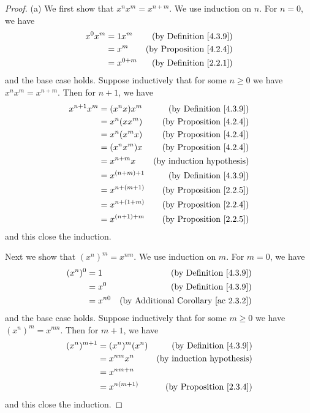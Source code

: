 \begin{proof}{(a)}
    We first show that \(x^n x^m = x^{n + m}\).
    We use induction on \(n\).
    For \(n = 0\), we have
    \begin{align*}
        x^0 x^m & = 1 x^m     & \text{(by Definition \ref{4.3.9})}  \\
                & = x^m       & \text{(by Proposition \ref{4.2.4})} \\
                & = x^{0 + m} & \text{(by Definition \ref{2.2.1})}
    \end{align*}
    and the base case holds.
    Suppose inductively that for some \(n \geq 0\) we have \(x^n x^m = x^{n + m}\).
    Then for \(n + 1\), we have
    \begin{align*}
        x^{n + 1} x^m & = (x^n x) x^m     & \text{(by Definition \ref{4.3.9})}  \\
                      & = x^n (x x^m)     & \text{(by Proposition \ref{4.2.4})} \\
                      & = x^n (x^m x)     & \text{(by Proposition \ref{4.2.4})} \\
                      & = (x^n x^m) x     & \text{(by Proposition \ref{4.2.4})} \\
                      & = x^{n + m} x     & \text{(by induction hypothesis)}    \\
                      & = x^{(n + m) + 1} & \text{(by Definition \ref{4.3.9})}  \\
                      & = x^{n + (m + 1)} & \text{(by Proposition \ref{2.2.5})} \\
                      & = x^{n + (1 + m)} & \text{(by Proposition \ref{2.2.4})} \\
                      & = x^{(n + 1) + m} & \text{(by Proposition \ref{2.2.5})}
    \end{align*}
    and this close the induction.

    Next we show that \((x^n)^m = x^{nm}\).
    We use induction on \(m\).
    For \(m = 0\), we have
    \begin{align*}
        (x^n)^0 & = 1      & \text{(by Definition \ref{4.3.9})}              \\
                & = x^0    & \text{(by Definition \ref{4.3.9})}              \\
                & = x^{n0} & \text{(by Additional Corollary \ref{ac 2.3.2})}
    \end{align*}
    and the base case holds.
    Suppose inductively that for some \(m \geq 0\) we have \((x^n)^m = x^{nm}\).
    Then for \(m + 1\), we have
    \begin{align*}
        (x^n)^{m + 1} & = (x^n)^m (x^n) & \text{(by Definition \ref{4.3.9})}  \\
                      & = x^{nm} x^n    & \text{(by induction hypothesis)}    \\
                      & = x^{nm + n}                                          \\
                      & = x^{n(m + 1)}  & \text{(by Proposition \ref{2.3.4})}
    \end{align*}
    and this close the induction.


\end{proof}

